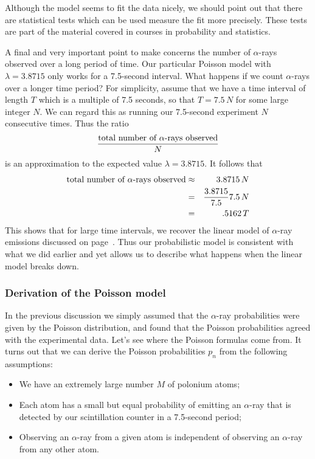 {{{{        Although the model seems to fit the data nicely, we should point out that there are statistical tests which can be used measure the fit more precisely.  These tests are part of the material covered in courses in probability and statistics.

\vspace*{3in}

        A final and very important point to make concerns the number of $\alpha$-rays observed over a long period of time.  Our particular Poisson model with $\lambda=3.8715$ only works for a 7.5-second interval.  What happens if we count $\alpha$-rays over a longer time period?  For simplicity, assume that we have a time interval of length $T$ which is a multiple of 7.5 seconds, so that $T = 7.5\,N$ for some large integer $N$.  We can regard this as running our 7.5-second experiment $N$ consecutive times. Thus the ratio
\[{\hbox{total number of $\alpha$-rays observed}\over N}\]
is an approximation to the expected value $\lambda = 3.8715$.  It follows that
\begin{eqnarray*}
\hbox{total number of $\alpha$-rays observed} & \approx & 3.8715\,N\\
        & = & {3.8715\over7.5}7.5\,N\\
        & = & .5162\,T
\end{eqnarray*}
This shows that for large time intervals, we recover the linear model of $\alpha$-ray emissions discussed on page~\pageref{linear}.  Thus our probabilistic model is consistent with what we did earlier and yet allows us to describe what happens when the linear model breaks down.

\subsubsection{Derivation of the Poisson model}

        In the previous discussion we simply assumed that the $\alpha$-ray probabilities were given by the Poisson distribution, and found that the Poisson probabilities agreed with the experimental data. Let's see where the Poisson formulas come from.  It turns out that we can derive the Poisson probabilities $p_n$ from the following assumptions:
\begin{itemize}
\item We have an extremely large number $M$ of polonium atoms;
\item Each atom has a small but equal probability of emitting an
$\alpha$-ray that is detected by our scintillation counter in a 7.5-second period;  
\item Observing an $\alpha$-ray from a given atom is independent of observing an $\alpha$-ray from any other atom.
\end{itemize}

}}}}
